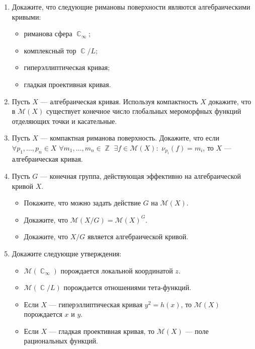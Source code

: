 \documentclass[a4paper, 12pt]{article}
\DeclareMathOperator{\ZZ}{\mathbb{Z}}
\DeclareMathOperator{\CC}{\mathbb{C}}
\begin{document}
\begin{enumerate}[noitemsep,topsep=0pt]
    \item Докажите, что следующие римановы поверхности являются алгебраическими кривыми:
    \begin{itemize}[noitemsep,topsep=0pt]
        \item риманова сфера $\CC_\infty$;
        \item комплексный тор $\CC/L$;
        \item гиперэллиптическая кривая;
        \item гладкая проективная кривая.
    \end{itemize}%
    \item Пусть $X$ --- алгебраическая кривая. Используя компактность $X$ докажите, что в $\mathcal{M}(X)$ существует конечное число глобальных мероморфных функций отделяющих точки и касательные. %
    \item Пусть $X$ --- компактная риманова поверхность. Докажите, что если $\forall p_1,\dots,p_n \in X$ $\forall m_1, \dots, m_n \in\ZZ$ $\exists f\in \mathcal{M}(X):$ $\nu_{p_i}(f)=m_i$, то $X$ --- алгебраическая кривая. %
    \item Пусть $G$ --- конечная группа, действующая эффективно на алгебраической кривой $X$.
    \begin{itemize}[noitemsep,topsep=0pt]
        \item Покажите, что можно задать действие $G$ на $\mathcal{M}(X)$.
        \item Докажите, что $\mathcal{M}(X/G) = \mathcal{M}(X)^G$.
        \item Докажите, что $X/G$ является алгебраической кривой.
    \end{itemize}%
    \item Докажите следующие утверждения:
    \begin{itemize}[noitemsep,topsep=0pt]
        \item $\mathcal{M}(\CC_\infty)$ порождается локальной координатой $z$.
        \item $\mathcal{M}(\CC/L)$ порождается отношениями тета-функций.
        \item Если $X$ --- гиперэллиптическая кривая $y^2=h(x)$, то $\mathcal{M}(X)$ порождается $x$ и $y$.
        \item Если $X$ --- гладкая проективная кривая, то $\mathcal{M}(X)$ --- поле рациональных функций.
    \end{itemize} %
\end{enumerate}
\end{document}
